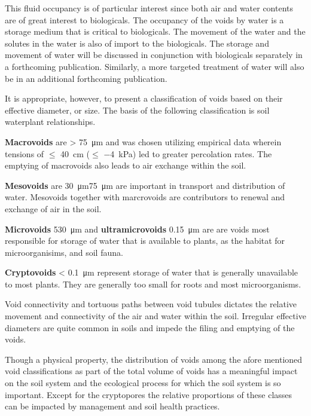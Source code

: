 \documentclass[a5paper]{book}
\begin{document}
This fluid occupancy is of particular interest since both air and water contents are of great interest to biologicals. The occupancy of the voids by water is a storage medium that is critical to biologicals. The movement of the water and the solutes in the water is also of import to the biologicals. The storage and movement of water will be discussed in conjunction with biologicals separately in a forthcoming publication. Similarly, a more targeted treatment of water will also be in an additional forthcoming publication.  

It is appropriate, however, to present a classification of voids based on their effective diameter, or size. The basis of the following classification is soil water\textemdash{}plant relationships.  

\textbf{Macrovoids} are \textgreater{} \SI{75}{\micro\metre} and was chosen utilizing empirical data wherein tensions of $\leq$ \SI{40}{\centi\metre} ($\leq$ \SI{-4}{kPa}) led to greater percolation rates. The emptying of macrovoids also leads to air exchange within the soil.  

\textbf{Mesovoids} are \SI{30}{\micro\metre}\textemdash \SI{75}{\micro\metre} are important in transport and distribution of water. Mesovoids together with marcrovoids are contributors to renewal and exchange of air in the soil.  

\textbf{Microvoids} \SI{5}{}\textemdash \SI{30}{\micro\metre} and \textbf{ultramicrovoids} \SI{0.1}{}\textemdash \SI{5}{\micro\metre} are are voids most responsible for storage of water that is available to plants, as the habitat for microorganisims, and soil fauna.  

\textbf{Cryptovoids} \textless{} \SI{0.1}{\micro\metre} represent storage of water that is generally unavailable to most plants. They are generally too small for roots and most microorganisms.  

Void connectivity and tortuous paths between void tubules dictates the relative movement and connectivity of the air and water within the soil. Irregular effective diameters are quite common in soils and impede the filing and emptying of the voids.  

Though a physical property, the distribution of voids among the afore mentioned void classifications as part of the total volume of voids has a meaningful impact on the soil system and the ecological process for which the soil system is so important. Except for the cryptopores the relative proportions of these classes can be impacted by management and soil health practices.  
\end{document}

